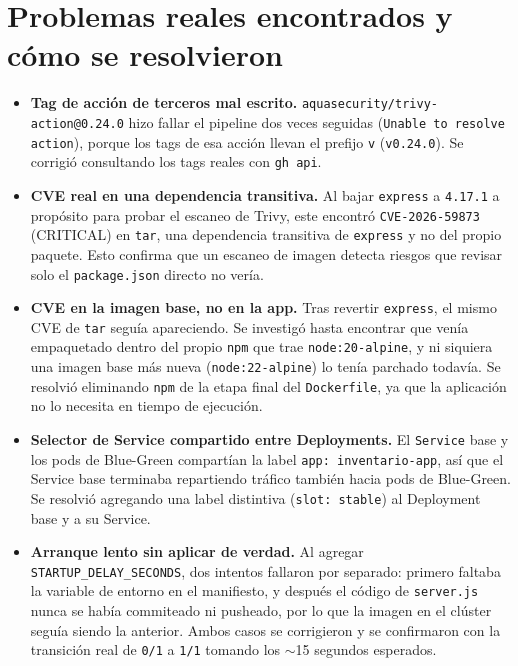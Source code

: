 \documentclass[11pt,a4paper]{article}
\begin{document}
\section{Problemas reales encontrados y cómo se resolvieron}

\begin{itemize}
  \item \textbf{Tag de acción de terceros mal escrito.} \texttt{aquasecurity/trivy-action@0.24.0}
    hizo fallar el pipeline dos veces seguidas (\texttt{Unable to resolve action}), porque los
    tags de esa acción llevan el prefijo \texttt{v} (\texttt{v0.24.0}). Se corrigió consultando
    los tags reales con \texttt{gh api}.
  \item \textbf{CVE real en una dependencia transitiva.} Al bajar \texttt{express} a
    \texttt{4.17.1} a propósito para probar el escaneo de Trivy, este encontró
    \texttt{CVE-2026-59873} (CRITICAL) en \texttt{tar}, una dependencia transitiva de
    \texttt{express} y no del propio paquete. Esto confirma que un escaneo de imagen detecta
    riesgos que revisar solo el \texttt{package.json} directo no vería.
  \item \textbf{CVE en la imagen base, no en la app.} Tras revertir \texttt{express}, el mismo
    CVE de \texttt{tar} seguía apareciendo. Se investigó hasta encontrar que venía empaquetado
    dentro del propio \texttt{npm} que trae \texttt{node:20-alpine}, y ni siquiera una imagen
    base más nueva (\texttt{node:22-alpine}) lo tenía parchado todavía. Se resolvió eliminando
    \texttt{npm} de la etapa final del \texttt{Dockerfile}, ya que la aplicación no lo necesita
    en tiempo de ejecución.
  \item \textbf{Selector de Service compartido entre Deployments.} El \texttt{Service} base y
    los pods de Blue-Green compartían la label \texttt{app: inventario-app}, así que el Service
    base terminaba repartiendo tráfico también hacia pods de Blue-Green. Se resolvió agregando
    una label distintiva (\texttt{slot: stable}) al Deployment base y a su Service.
  \item \textbf{Arranque lento sin aplicar de verdad.} Al agregar \texttt{STARTUP\_DELAY\_SECONDS},
    dos intentos fallaron por separado: primero faltaba la variable de entorno en el manifiesto,
    y después el código de \texttt{server.js} nunca se había commiteado ni pusheado, por lo que
    la imagen en el clúster seguía siendo la anterior. Ambos casos se corrigieron y se
    confirmaron con la transición real de \texttt{0/1} a \texttt{1/1} tomando los
    $\sim$15 segundos esperados.
\end{itemize}
\end{document}
